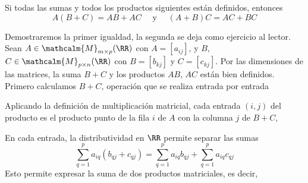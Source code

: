 \begin{theorem}{}{}
    Si todas las sumas y todos los productos siguientes están definidos, entonces
    $$A(B + C) = AB + AC \quad \text{ y } \quad (A + B)C = AC + BC$$

    \tcblower
    \demostracion Demostraremos la primer igualdad, la segunda se deja como ejercicio al lector. Sean $A \in \mathcalm{M}_{m \times p}(\RR)$ con $A = [ a_{ij} ]$, y $B$, $C \in \mathcalm{M}_{p \times n}(\RR)$ con $B = [ b_{kj} ]$ y $C = [ c_{kj} ]$. Por las dimensiones de las matrices, la suma $B + C$ y los productos $AB$, $AC$ están bien definidos. Primero calculamos $B + C$, operación que se realiza entrada por entrada
    \begin{matrizn}
    \end{matrizn}
    Aplicando la definición de multiplicación matricial, cada entrada $(i, j)$ del producto es el producto punto de la fila $i$ de $A$ con la columna $j$ de $B + C$,
    \begin{matrizn}
    \end{matrizn}
    En cada entrada, la distributividad en $\RR$ permite separar las sumas
    $$\sum_{q=1}^{p} a_{iq}(b_{qj} + c_{qj}) = \sum_{q=1}^{p} a_{iq}b_{qj} + \sum_{q=1}^{p} a_{iq}c_{qj}$$
    Esto permite expresar la suma de dos productos matriciales, es decir,

\end{theorem}
